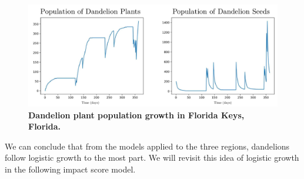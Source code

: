 \begin{figure}[h!]
\centering
    \includegraphics[scale=0.5]{figures/floridapopulation.pdf}
    \captionsetup{width=0.9\textwidth}
    \caption{\textbf{Dandelion plant population growth in Florida Keys, Florida.}}
    \label{fig:floridapopulation}
\end{figure}

We can conclude that from the models applied to the three regions, dandelions follow logistic growth to the most part. We will revisit this idea of logistic growth in the following impact score model.